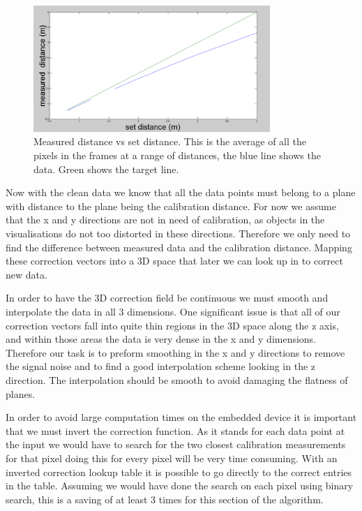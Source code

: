 \documentclass[]{article}
\begin{document}
{\begin{figure}[htb]
	\begin{center}
		\includegraphics[width = 0.8\textwidth]{avDist}
	\end{center}
	\caption{Measured distance vs set distance. This is the average of all the pixels in the frames at a range of distances, the blue line shows the data. Green shows the target line.}
	\label{fig:avDist}
\end{figure}

Now with the clean data we know that all the data points must belong to a plane with distance to the plane being the calibration distance. For now we assume that the x and y directions are not in need of calibration, as objects in the visualisations do not too distorted in these directions. Therefore we only need to find the difference between measured data and the calibration distance. Mapping these correction vectors into a 3D space that later we can look up in to correct new data. 

In order to have the 3D correction field be continuous we must smooth and interpolate the data in all 3 dimensions. One significant issue is that all of our correction vectors fall into quite thin regions in the 3D space along the z axis, and within those areas the data is very dense in the x and y dimensions. Therefore our task is to preform smoothing in the x and y directions to remove the signal noise and to find a good interpolation scheme looking in the z direction. The interpolation should be smooth to avoid damaging the flatness of planes. 

In order to avoid large computation times on the embedded device it is important that we must invert the correction function. As it stands for each data point at the input we would have to search for the two closest calibration measurements for that pixel doing this for every pixel will be very time consuming. With an inverted correction lookup table it is possible to go directly to the correct entries in the table. Assuming we would have done the search on each pixel using binary search, this is a saving of at least 3 times for this section of the algorithm. 

}
\end{document}
